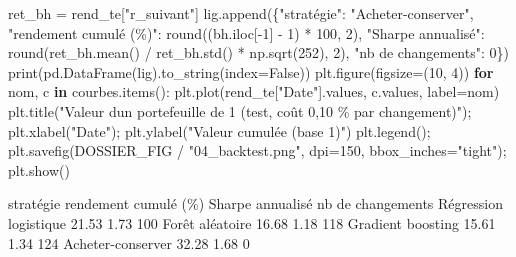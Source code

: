 \documentclass[
  10pt,
]{article}
\newenvironment{Shaded}{}{}
\newcommand{\BuiltInTok}[1]{\textcolor[rgb]{0.00,0.50,0.00}{#1}}
\newcommand{\ControlFlowTok}[1]{\textcolor[rgb]{0.00,0.44,0.13}{\textbf{#1}}}
\newcommand{\DecValTok}[1]{\textcolor[rgb]{0.25,0.63,0.44}{#1}}
\newcommand{\KeywordTok}[1]{\textcolor[rgb]{0.00,0.44,0.13}{\textbf{#1}}}
\newcommand{\NormalTok}[1]{#1}
\newcommand{\OperatorTok}[1]{\textcolor[rgb]{0.40,0.40,0.40}{#1}}
\newcommand{\StringTok}[1]{\textcolor[rgb]{0.25,0.44,0.63}{#1}}
\newcommand{\VariableTok}[1]{\textcolor[rgb]{0.10,0.09,0.49}{#1}}
\begin{document}
\begin{Shaded}
\begin{Highlighting}[]
\NormalTok{ret\_bh }\OperatorTok{=}\NormalTok{ rend\_te[}\StringTok{"r\_suivant"}\NormalTok{]}
\NormalTok{lig.append(\{}\StringTok{"stratégie"}\NormalTok{: }\StringTok{"Acheter{-}conserver"}\NormalTok{, }\StringTok{"rendement cumulé (\%)"}\NormalTok{: }\BuiltInTok{round}\NormalTok{((bh.iloc[}\OperatorTok{{-}}\DecValTok{1}\NormalTok{] }\OperatorTok{{-}} \DecValTok{1}\NormalTok{) }\OperatorTok{*} \DecValTok{100}\NormalTok{, }\DecValTok{2}\NormalTok{),}
            \StringTok{"Sharpe annualisé"}\NormalTok{: }\BuiltInTok{round}\NormalTok{(ret\_bh.mean() }\OperatorTok{/}\NormalTok{ ret\_bh.std() }\OperatorTok{*}\NormalTok{ np.sqrt(}\DecValTok{252}\NormalTok{), }\DecValTok{2}\NormalTok{), }\StringTok{"nb de changements"}\NormalTok{: }\DecValTok{0}\NormalTok{\})}
\BuiltInTok{print}\NormalTok{(pd.DataFrame(lig).to\_string(index}\OperatorTok{=}\VariableTok{False}\NormalTok{))}
\NormalTok{plt.figure(figsize}\OperatorTok{=}\NormalTok{(}\DecValTok{10}\NormalTok{, }\DecValTok{4}\NormalTok{))}
\ControlFlowTok{for}\NormalTok{ nom, c }\KeywordTok{in}\NormalTok{ courbes.items(): plt.plot(rend\_te[}\StringTok{"Date"}\NormalTok{].values, c.values, label}\OperatorTok{=}\NormalTok{nom)}
\NormalTok{plt.title(}\StringTok{"Valeur d\textquotesingle{}un portefeuille de 1 (test, coût 0,10 \% par changement)"}\NormalTok{)}\OperatorTok{;}\NormalTok{ plt.xlabel(}\StringTok{"Date"}\NormalTok{)}\OperatorTok{;}\NormalTok{ plt.ylabel(}\StringTok{"Valeur cumulée (base 1)"}\NormalTok{)}
\NormalTok{plt.legend()}\OperatorTok{;}\NormalTok{ plt.savefig(DOSSIER\_FIG }\OperatorTok{/} \StringTok{"04\_backtest.png"}\NormalTok{, dpi}\OperatorTok{=}\DecValTok{150}\NormalTok{, bbox\_inches}\OperatorTok{=}\StringTok{"tight"}\NormalTok{)}\OperatorTok{;}\NormalTok{ plt.show()}
\end{Highlighting}
\end{Shaded}

\begin{Shaded}
\begin{Highlighting}[]
\NormalTok{            stratégie  rendement cumulé (\%)  Sharpe annualisé  nb de changements}
\NormalTok{Régression logistique                 21.53              1.73                100}
\NormalTok{      Forêt aléatoire                 16.68              1.18                118}
\NormalTok{    Gradient boosting                 15.61              1.34                124}
\NormalTok{    Acheter{-}conserver                 32.28              1.68                  0}
\end{Highlighting}
\end{Shaded}
\end{document}
